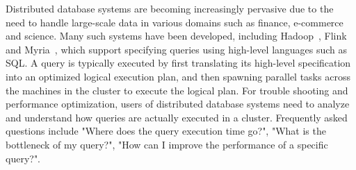 



Distributed database systems are becoming increasingly pervasive due to the need to handle large-scale data in various domains such as finance, e-commerce and science. Many such systems have been developed, including Hadoop~\cite{hadoop}, Flink~\cite{carbone2015apache} and Myria~\cite{halperin2014demonstration}, which support specifying queries using high-level languages such as SQL. A query is typically executed by first translating its high-level specification into an optimized logical execution plan, and then spawning parallel tasks across the machines in the cluster to execute the logical plan. For trouble shooting and performance optimization, users of distributed database systems need to analyze and understand how queries are actually executed in a cluster. Frequently asked questions include "Where does the query execution time go?", "What is the bottleneck of my query?", "How can I improve the performance of a specific query?".    





